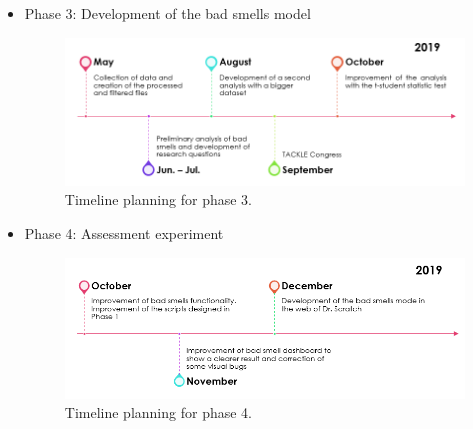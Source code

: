 \begin{itemize}
    \item Phase 3: Development of the bad smells model 
    
    \begin{figure}[ht]
    \centering
        \includegraphics[width=12cm, keepaspectratio]{img/phase_3.png}
        \caption{Timeline planning for phase 3.}
        \label{fig:phase_3}
    \end{figure}
    
    \item Phase 4: Assessment experiment
    
    \begin{figure}[ht]
    \centering
        \includegraphics[width=12cm, keepaspectratio]{img/phase_4.png}
        \caption{Timeline planning for phase 4.}
        \label{fig:phase_4}
    \end{figure}
    
\end{itemize}
